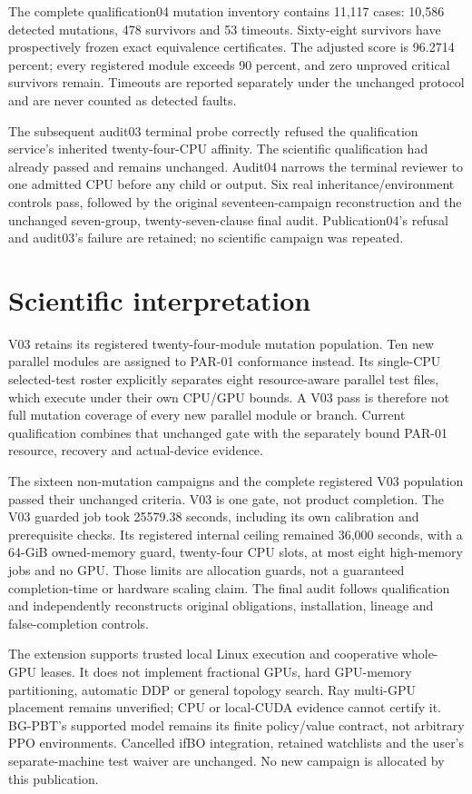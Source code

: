 The complete qualification04 mutation inventory contains 11,117 cases:
10,586 detected mutations, 478 survivors and 53 timeouts. Sixty-eight survivors
have prospectively frozen exact equivalence certificates. The adjusted score is
96.2714 percent; every registered module exceeds 90 percent, and zero unproved
critical survivors remain. Timeouts are reported separately under the unchanged
protocol and are never counted as detected faults.

The subsequent audit03 terminal probe correctly refused the qualification
service's inherited twenty-four-CPU affinity. The scientific qualification had
already passed and remains unchanged. Audit04 narrows the terminal reviewer to
one admitted CPU before any child or output. Six real inheritance/environment
controls pass, followed by the original seventeen-campaign reconstruction and
the unchanged seven-group, twenty-seven-clause final audit. Publication04's
refusal and audit03's failure are retained; no scientific campaign was repeated.

\section{Scientific interpretation}
V03 retains its registered twenty-four-module mutation population. Ten new
parallel modules are assigned to PAR-01 conformance instead. Its single-CPU
selected-test roster explicitly separates eight resource-aware parallel test
files, which execute under their own CPU/GPU bounds. A V03 pass is therefore
not full mutation coverage of every new parallel module or branch. Current
qualification combines that unchanged gate with the separately bound PAR-01
resource, recovery and actual-device evidence.

The sixteen non-mutation campaigns and the complete registered V03 population
passed their unchanged criteria. V03 is one gate, not product completion.
The V03 guarded job took 25579.38 seconds, including its own calibration
and prerequisite checks. Its registered internal ceiling remained 36,000
seconds, with a 64-GiB owned-memory guard, twenty-four CPU slots, at most eight
high-memory jobs and no GPU. Those limits are allocation guards, not a
guaranteed completion-time or hardware scaling claim. The final audit follows
qualification and independently reconstructs original obligations, installation,
lineage and false-completion controls.

The extension supports trusted local Linux execution and cooperative whole-GPU
leases. It does not implement fractional GPUs, hard GPU-memory partitioning,
automatic DDP or general topology search. Ray multi-GPU placement remains
unverified; CPU or local-CUDA evidence cannot certify it. BG-PBT's supported
model remains its finite policy/value contract, not arbitrary PPO environments.
Cancelled ifBO integration, retained watchlists and the user's separate-machine
test waiver are unchanged. No new campaign is allocated by this publication.
